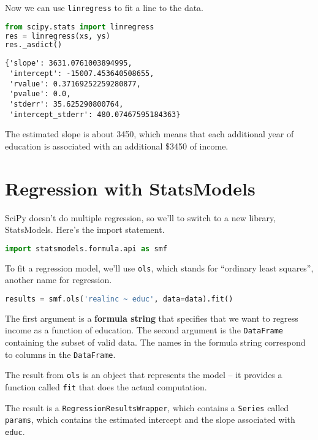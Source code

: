 Now we can use \passthrough{\lstinline!linregress!} to fit a line to the
data.

\begin{lstlisting}[language=Python,style=source]
from scipy.stats import linregress
res = linregress(xs, ys)
res._asdict()
\end{lstlisting}

\begin{lstlisting}[style=output]
{'slope': 3631.0761003894995,
 'intercept': -15007.453640508655,
 'rvalue': 0.37169252259280877,
 'pvalue': 0.0,
 'stderr': 35.625290800764,
 'intercept_stderr': 480.07467595184363}
\end{lstlisting}

The estimated slope is about 3450, which means that each additional year
of education is associated with an additional \$3450 of income.

\section{Regression with StatsModels}\label{regression-with-statsmodels}

SciPy doesn't do multiple regression, so we'll to switch to a new
library, StatsModels. Here's the import statement.

\begin{lstlisting}[language=Python,style=source]
import statsmodels.formula.api as smf
\end{lstlisting}

To fit a regression model, we'll use \passthrough{\lstinline!ols!},
which stands for ``ordinary least squares'', another name for
regression.

\begin{lstlisting}[language=Python,style=source]
results = smf.ols('realinc ~ educ', data=data).fit()
\end{lstlisting}

The first argument is a \textbf{formula string} that specifies that we
want to regress income as a function of education. The second argument
is the \passthrough{\lstinline!DataFrame!} containing the subset of
valid data. The names in the formula string correspond to columns in the
\passthrough{\lstinline!DataFrame!}.

The result from \passthrough{\lstinline!ols!} is an object that
represents the model -- it provides a function called
\passthrough{\lstinline!fit!} that does the actual computation.

The result is a \passthrough{\lstinline!RegressionResultsWrapper!},
which contains a \passthrough{\lstinline!Series!} called
\passthrough{\lstinline!params!}, which contains the estimated intercept
and the slope associated with \passthrough{\lstinline!educ!}.

